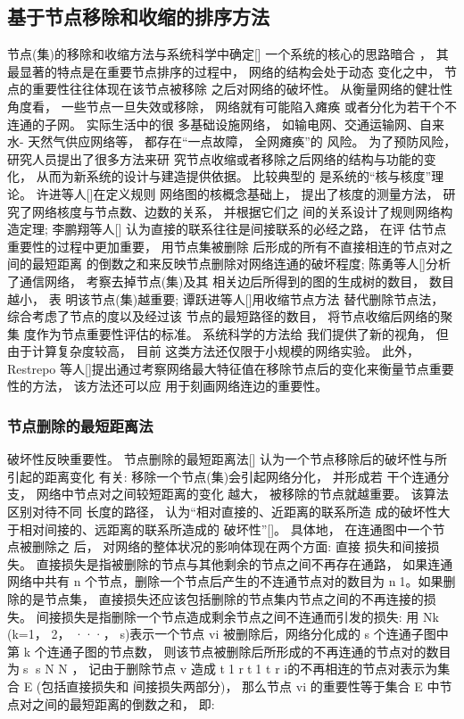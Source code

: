 	\subsection{基于节点移除和收缩的排序方法}
	节点(集)的移除和收缩方法与系统科学中确定[] 一个系统的核心的思路暗合 ， 其最显著的特点是在重要节点排序的过程中， 网络的结构会处于动态 变化之中， 节点的重要性往往体现在该节点被移除 之后对网络的破坏性。 从衡量网络的健壮性角度看， 一些节点一旦失效或移除， 网络就有可能陷入瘫痪 或者分化为若干个不连通的子网。 实际生活中的很 多基础设施网络， 如输电网、交通运输网、自来水- 天然气供应网络等， 都存在“一点故障， 全网瘫痪”的 风险。 为了预防风险， 研究人员提出了很多方法来研 究节点收缩或者移除之后网络的结构与功能的变化， 从而为新系统的设计与建造提供依据。 比较典型的 是系统的“核与核度”理论。 许进等人[]在定义规则 网络图的核概念基础上， 提出了核度的测量方法， 研 究了网络核度与节点数、边数的关系， 并根据它们之 间的关系设计了规则网络构造定理; 李鹏翔等人[] 认为直接的联系往往是间接联系的必经之路， 在评 估节点重要性的过程中更加重要， 用节点集被删除 后形成的所有不直接相连的节点对之间的最短距离 的倒数之和来反映节点删除对网络连通的破坏程度; 陈勇等人[]分析了通信网络， 考察去掉节点(集)及其 相关边后所得到的图的生成树的数目， 数目越小， 表 明该节点(集)越重要; 谭跃进等人[]用收缩节点方法 替代删除节点法， 综合考虑了节点的度以及经过该 节点的最短路径的数目， 将节点收缩后网络的聚集 度作为节点重要性评估的标准。 系统科学的方法给 我们提供了新的视角， 但由于计算复杂度较高， 目前 这类方法还仅限于小规模的网络实验。 此外， Restrepo 等人[]提出通过考察网络最大特征值在移除节点后的变化来衡量节点重要性的方法， 该方法还可以应 用于刻画网络连边的重要性。
	\subsubsection{节点删除的最短距离法}
	破坏性反映重要性。 节点删除的最短距离法[] 认为一个节点移除后的破坏性与所引起的距离变化 有关: 移除一个节点(集)会引起网络分化， 并形成若 干个连通分支， 网络中节点对之间较短距离的变化 越大， 被移除的节点就越重要。 该算法区别对待不同 长度的路径， 认为“相对直接的、近距离的联系所造 成的破坏性大于相对间接的、远距离的联系所造成的 破坏性”[]。 具体地， 在连通图中一个节点被删除之 后， 对网络的整体状况的影响体现在两个方面: 直接 损失和间接损失。
				直接损失是指被删除的节点与其他剩余的节点之间不再存在通路， 如果连通网络中共有 n 个节点，删除一个节点后产生的不连通节点对的数目为 n1。如果删除的是节点集， 直接损失还应该包括删除的节点集内节点之间的不再连接的损失。 间接损失是指删除一个节点造成剩余节点之间不连通而引发的损失: 用 Nk (k=1， 2， ···， s)表示一个节点 vi 被删除后，网络分化成的 s 个连通子图中第 k 个连通子图的节点数， 则该节点被删除后所形成的不再连通的节点对的数目为s s N N ， 记由于删除节点 v 造成 t1 rt1 t r i的不再相连的节点对表示为集合 E (包括直接损失和 间接损失两部分)， 那么节点 vi 的重要性等于集合 E 中节点对之间的最短距离的倒数之和， 即:

